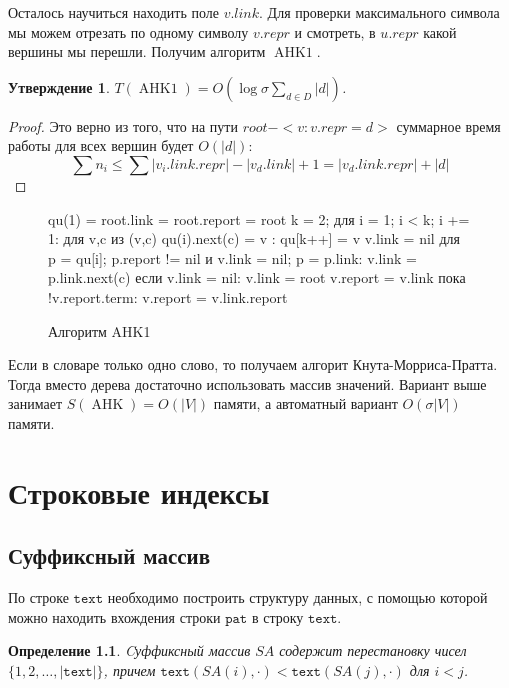 \documentclass[10pt]{book}
\theoremstyle{plain}
\newtheorem{stm}{Утверждение}[section]
\newtheorem{definition}{Определение}[section]
\newcommand{\textm}{\texttt{text}}
\newcommand{\patm}{\texttt{pat}}
\newcommand{\algm}[1]{\operatorname{#1}}
\newenvironment{figurem}[1][]
  {\begin{figure}[p]
  \caption{#1}
  \centering
  }
  {
  \end{figure}
  }
\begin{document}
Осталось научиться находить поле $v.link$. Для проверки максимального символа мы
можем отрезать по одному символу $v.repr$ и смотреть, в $u.repr$ какой вершины
мы перешли. Получим алгоритм $\algm{AHK1}$.

\begin{stm}
  $T(\algm{AHK1}) = O(\log \sigma \sum_{d \in D} |d|)$.
\end{stm}
\begin{proof}
  Это верно из того, что на пути $root-<v:v.repr = d>$ суммарное время работы для
  всех вершин будет $O(|d|)$:
  $$\sum n_i \le \sum |v_i.link.repr| - |v_d.link| + 1 = |v_d.link.repr| + |d|$$
\end{proof}

\begin{figurem}[Алгоритм AHK1]
\begin{verbm}
  qu(1) = root.link = root.report = root
  k = 2;
  для i = 1; i < k; i += 1:
    для v,c из { (v,c) qu(i).next(c) = v }:
      qu[k++] = v
      v.link = nil
      для p = qu[i]; p.report != nil и v.link = nil; p = p.link:
        v.link = p.link.next(c)
      если v.link = nil:
        v.link = root
      v.report = v.link
      пока !v.report.term:
        v.report = v.link.report
\end{verbm}
\end{figurem}

Если в словаре только одно слово, то получаем алгорит Кнута-Морриса-Пратта.
Тогда вместо дерева достаточно использовать массив значений. Вариант выше
занимает $S(\algm{AHK}) = O(|V|)$ памяти, а автоматный вариант $O(\sigma|V|)$
памяти.

\chapter{Строковые индексы}

\section{Суффиксный массив}

По строке $\textm$ необходимо построить структуру данных, с помощью которой
можно находить вхождения строки $\patm$ в строку $\textm$.

\begin{definition}
  Cуффиксный массив $SA$ содержит перестановку чисел $\{1,2,\ldots,|\textm|\}$,
  причем $\textm(SA(i), \cdot) < \textm(SA(j), \cdot)$ для $i < j$.
\end{definition}
\end{document}
